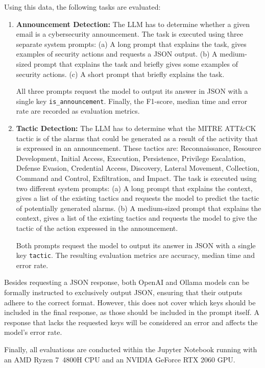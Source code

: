 Using this data, the following tasks are evaluated:
\begin{enumerate}
    \item \textbf{Announcement Detection:}
    The LLM has to determine whether a given email is a cybersecurity announcement.
    The task is executed using three separate system prompts:
    (a) A long prompt that explains the task, gives examples of security actions and requests a JSON output.
    (b) A medium-sized prompt that explains the task and briefly gives some examples of security actions.
    (c) A short prompt that briefly explains the task.

    All three prompts request the model to output its answer in JSON with a single key \texttt{is\_announcement}.
    Finally, the F1-score, median time and error rate are recorded as evaluation metrics.

    \item \textbf{Tactic Detection:}
    The LLM has to determine what the MITRE ATT\&CK tactic is of the alarms that could be generated as a result of the
    activity that is expressed in an announcement.
    These tactics are: Reconnaissance, Resource Development, Initial Access, Execution, Persistence, Privilege
    Escalation, Defense Evasion, Credential Access, Discovery, Lateral Movement, Collection, Command and Control,
    Exfiltration, and Impact.
    The task is executed using two different system prompts:
    (a) A long prompt that explains the context, gives a list of the existing tactics and requests the model to predict
    the tactic of potentially generated alarms.
    (b) A medium-sized prompt that explains the context, gives a list of the existing tactics and requests the model to
    give the tactic of the action expressed in the announcement.

    Both prompts request the model to output its answer in JSON with a single key \texttt{tactic}.
    The resulting evaluation metrics are accuracy, median time and error rate.
\end{enumerate}

Besides requesting a JSON response, both OpenAI and Ollama models can be formally instructed to exclusively output
JSON, ensuring that their outputs adhere to the correct format.
However, this does not cover which keys should be included in the final response, as those should be included in the
prompt itself.
A response that lacks the requested keys will be considered an error and affects the model's error rate.

Finally, all evaluations are conducted within the Jupyter Notebook running with an AMD Ryzen 7\ 4800H CPU and an NVIDIA
GeForce RTX 2060 GPU\@.
